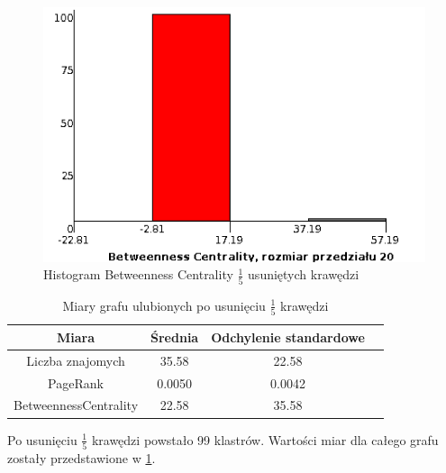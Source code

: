 \documentclass[10pt,a4paper]{article}
\begin{document}
\begin{figure}[H]
\centering
\caption{Histogram Betweenness Centrality $\frac{1}{5}$ usuniętych krawędzi}
\includegraphics[scale=0.6]{wyniki/final200Loved/1200lovedBCHist.png}
\end{figure}


\begin{table}[H]
  \caption{Miary grafu ulubionych po usunięciu $\frac{1}{5}$ krawędzi}
  \centering
    \begin{tabular}{cccc}
    \addlinespace
    \toprule
    Miara & Średnia  & Odchylenie standardowe \\
    \midrule
    Liczba znajomych & 35.58 & 22.58 \\
    PageRank & 0.0050 & 0.0042 \\
    BetweennessCentrality & 22.58 & 35.58\\ 
    \bottomrule
    \end{tabular}
  \label{tab:frsum22}
\end{table}


Po usunięciu $\frac{1}{5}$ krawędzi powstało 99 klastrów. Wartości miar dla całego grafu zostały przedstawione w  \ref{tab:frsum22}.
\end{document}
